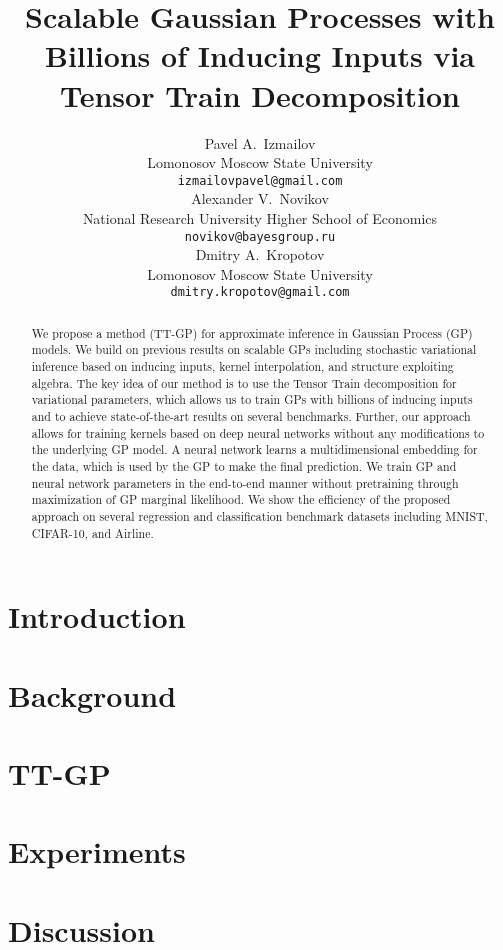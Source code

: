 \documentclass{article}
\title{Scalable Gaussian Processes with Billions of Inducing Inputs via Tensor Train
      Decomposition}
\author{
  Pavel A.~Izmailov \\
  Lomonosov Moscow State University\\
  \texttt{izmailovpavel@gmail.com} \\
  \And
  Alexander V.~Novikov\\
  National Research University Higher School of Economics \\
  \texttt{novikov@bayesgroup.ru} \\
  \AND
  Dmitry A.~Kropotov \\
  Lomonosov Moscow State University\\
  \texttt{dmitry.kropotov@gmail.com} \\
}
\begin{document}

\maketitle

\begin{abstract}
  We propose a method (TT-GP) for approximate inference in Gaussian Process (GP) 
  models. We build on previous results on scalable GPs including stochastic 
  variational inference based on inducing inputs, kernel interpolation, and 
  structure exploiting algebra.
  The key idea of our method is to use
  the Tensor Train decomposition for variational parameters, which allows us to train
  GPs with billions of inducing inputs and to achieve state-of-the-art results
  on several benchmarks. Further, our approach allows for training kernels based on
  deep neural networks without any modifications to the underlying GP model.
  A neural network learns a multidimensional embedding for the data, which is
  used by the GP to make the final prediction.
  We train GP and neural network parameters in the end-to-end manner
  without pretraining through maximization of GP marginal likelihood.
  We show the efficiency of the
  proposed approach on several regression and classification benchmark datasets
  including MNIST, CIFAR-10, and Airline.

\end{abstract}

\section{Introduction}
  

\section {Background}
  
\section{TT-GP}
  

\section{Experiments}
  

%  

\section{Discussion}
  




\end{document}
